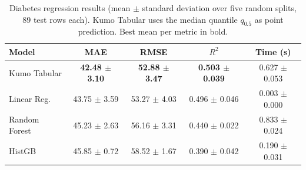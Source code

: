 \begin{table}[t]
\centering
\caption{Diabetes regression results (mean $\pm$ standard deviation over five random splits, 89 test rows each). Kumo Tabular uses the median quantile $q_{0.5}$ as point prediction. Best mean per metric in bold.}
\label{tab:regression}
\setlength{\tabcolsep}{5pt}
\begin{tabular}{lcccc}
\toprule
Model & MAE & RMSE & $R^2$ & Time (s) \\
\midrule
Kumo Tabular & \textbf{42.48 $\pm$ 3.10} & \textbf{52.88 $\pm$ 3.47} & \textbf{0.503 $\pm$ 0.039} & 0.627 $\pm$ 0.053 \\
Linear Reg. & 43.75 $\pm$ 3.59 & 53.27 $\pm$ 4.03 & 0.496 $\pm$ 0.046 & 0.003 $\pm$ 0.000 \\
Random Forest & 45.23 $\pm$ 2.63 & 56.16 $\pm$ 3.31 & 0.440 $\pm$ 0.022 & 0.833 $\pm$ 0.024 \\
HistGB & 45.85 $\pm$ 0.72 & 58.52 $\pm$ 1.67 & 0.390 $\pm$ 0.042 & 0.190 $\pm$ 0.031 \\
\bottomrule
\end{tabular}
\end{table}
